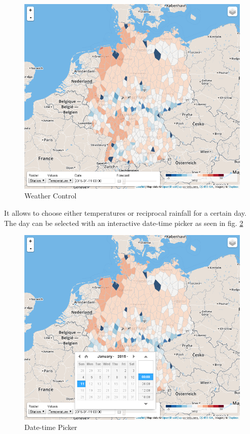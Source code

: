 \documentclass[paper=a4, fontsize=11pt]{scrartcl} %
\numberwithin{equation}{section} %
\numberwithin{figure}{section} %
\numberwithin{table}{section} %
\begin{document}
\begin{figure}[htbp]
\includegraphics[width=1\textwidth]{pictures/screenshot-control.png}
\caption{Weather Control}
\label{fig:weather-control}
\end{figure}

\newpage
It allows to choose either temperatures or reciprocal rainfall for a
certain day. The day can be selected with an interactive date-time picker
as seen in fig. \ref{fig:date-time-picker}

\begin{figure}[htbp]
\centering
\includegraphics[width=1\textwidth]{pictures/screenshot-control-datetime.png}
\caption{Date-time Picker}
\label{fig:date-time-picker}
\end{figure}
\end{document}
